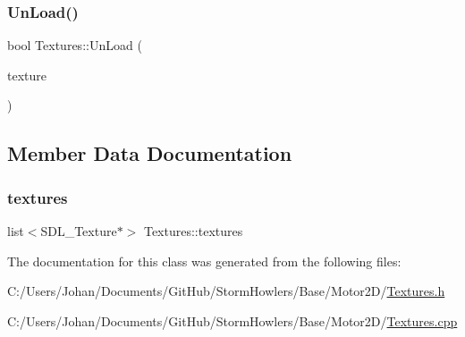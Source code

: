 \subsubsection{\texorpdfstring{UnLoad()}{UnLoad()}}
{\footnotesize\ttfamily bool Textures\+::\+Un\+Load (\begin{DoxyParamCaption}\item[{S\+D\+L\+\_\+\+Texture $\ast$}]{texture }\end{DoxyParamCaption})}



\subsection{Member Data Documentation}
\mbox{\label{class_textures_ad7467bd1532706adc0a2ee0db1c227c6}} 
\subsubsection{\texorpdfstring{textures}{textures}}
{\footnotesize\ttfamily list$<$S\+D\+L\+\_\+\+Texture$\ast$$>$ Textures\+::textures}



The documentation for this class was generated from the following files\+:\begin{DoxyCompactItemize}
\item 
C\+:/\+Users/\+Johan/\+Documents/\+Git\+Hub/\+Storm\+Howlers/\+Base/\+Motor2\+D/\mbox{\hyperlink{_textures_8h}{Textures.\+h}}\item 
C\+:/\+Users/\+Johan/\+Documents/\+Git\+Hub/\+Storm\+Howlers/\+Base/\+Motor2\+D/\mbox{\hyperlink{_textures_8cpp}{Textures.\+cpp}}\end{DoxyCompactItemize}
